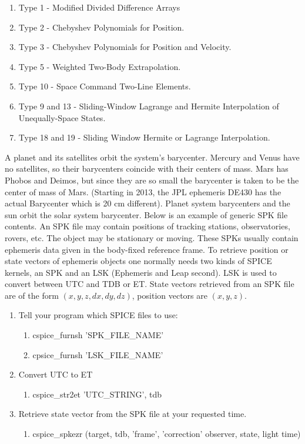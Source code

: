 \documentclass[crop=false,class=article,oneside]{standalone}
\begin{document}
            \begin{enumerate}
                \item Type 1 - Modified Divided Difference Arrays
                \item Type 2 - Chebyshev Polynomials for Position.
                \item Type 3 - Chebyshev Polynomials for Position and Velocity.
                \item Type 5 - Weighted Two-Body Extrapolation.
                \item Type 10 - Space Command Two-Line Elements.
                \item Type 9 and 13 - Sliding-Window Lagrange and Hermite Interpolation of Unequally-Space States.
                \item Type 18 and 19 - Sliding Window Hermite or Lagrange Interpolation.
            \end{enumerate}
            A planet and its satellites orbit the system's barycenter. Mercury and Venus have no satellites, so their barycenters coincide with their centers of mass. Mars has Phobos and Deimos, but since they are so small the barycenter is taken to be the center of mass of Mars. (Starting in 2013, the JPL ephemeris DE430 has the actual Barycenter which is 20 cm different). Planet system barycenters and the sun orbit the solar system barycenter. Below is an example of generic SPK file contents.
            An SPK file may contain positions of tracking stations, observatories, rovers, etc. The object may be stationary or moving. These SPKs usually contain ephemeris data given in the body-fixed reference frame. To retrieve position or state vectors of ephemeris objects one normally needs two kinds of SPICE kernels, an SPK and an LSK (Ephemeris and Leap second). LSK is used to convert between UTC and TDB or ET. State vectors retrieved from an SPK file are of the form $(x,y,z,dx,dy,dz)$, position vectors are $(x,y,z)$.
            \begin{enumerate}
                \item Tell your program which SPICE files to use:
                \begin{enumerate}
                    \item cspice\_furnsh 'SPK\_FILE\_NAME'
                    \item cpsice\_furnsh 'LSK\_FILE\_NAME'
                \end{enumerate}
                \item Convert UTC to ET
                \begin{enumerate}
                    \item cspice\_str2et 'UTC\_STRING', tdb
                \end{enumerate}
                \item Retrieve state vector from the SPK file at your requested time.
                \begin{enumerate}
                    \item cspice\_spkezr (target, tdb, 'frame', 'correction' observer, state, light time)
                \end{enumerate}
            \end{enumerate}
\end{document}
